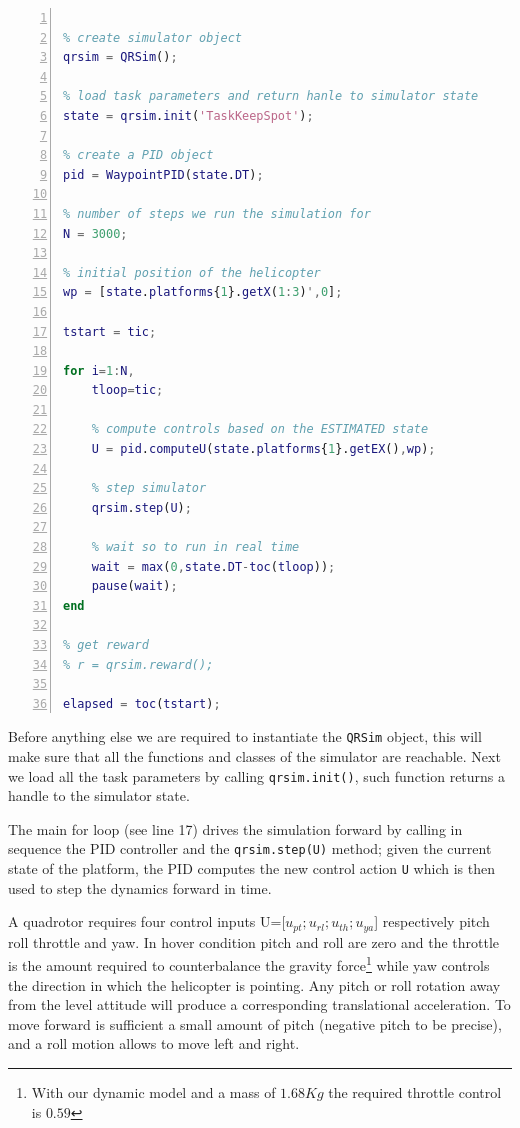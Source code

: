 \documentclass[a4paper,11pt]{report}
\newcommand{\snamettt}{\texttt{QRSim}\xspace}
\begin{document}
\begin{lstlisting}[float=ht!bp,caption=main script,language=Matlab,frame=lines,label=lst:main,numbers=left,basicstyle=\small]

% create simulator object
qrsim = QRSim();

% load task parameters and return hanle to simulator state
state = qrsim.init('TaskKeepSpot');

% create a PID object
pid = WaypointPID(state.DT);

% number of steps we run the simulation for
N = 3000;

% initial position of the helicopter
wp = [state.platforms{1}.getX(1:3)',0];

tstart = tic;

for i=1:N,
    tloop=tic;

    % compute controls based on the ESTIMATED state 
    U = pid.computeU(state.platforms{1}.getEX(),wp);

    % step simulator
    qrsim.step(U);
    
    % wait so to run in real time
    wait = max(0,state.DT-toc(tloop));
    pause(wait);
end

% get reward
% r = qrsim.reward();

elapsed = toc(tstart);
\end{lstlisting}
Before anything else we are required to instantiate the \snamettt object, this will make sure that all the functions and classes of the simulator are reachable. Next we load all the task parameters by calling \texttt{qrsim.init()}, such function returns a handle to the simulator state.

The main for loop (see line 17) drives the simulation forward by calling in sequence the PID controller and the \texttt{qrsim.step(U)} method; given the current state of the platform, the PID computes the new control action  \texttt{U} which is then used to step the dynamics forward in time.

A quadrotor requires four control inputs U=[$u_{pt};u_{rl};u_{th};u_{ya}$] respectively pitch roll throttle and yaw.
In hover condition pitch and roll are zero and the throttle is the amount required to counterbalance the gravity force\footnote{With our dynamic model and a mass of $1.68Kg$ the required throttle control is $0.59$} while yaw controls the direction in which the helicopter is pointing.  
Any pitch or roll rotation away from the level attitude will produce a corresponding translational acceleration. To move forward is sufficient a small amount of pitch (negative pitch to be precise), and a roll motion allows to move left and right. 
\end{document}
